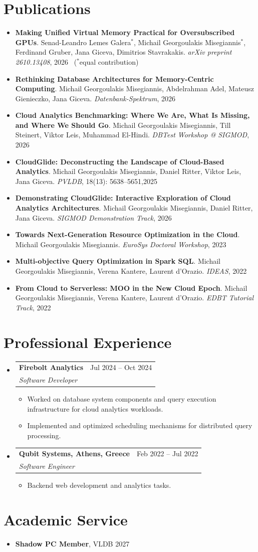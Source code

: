 \documentclass[letterpaper,11pt]{article}
\makeatletter
\newcommand{\resumeItem}[1]{
  \item\small{
    {#1 \vspace{-2pt}}
  }
}
\newcommand{\resumeSubheading}[4]{
  \vspace{-2pt}\item
    \begin{tabular*}{0.97\textwidth}[t]{l@{\extracolsep{\fill}}r}
      \textbf{#1} & #2 \\
      \textit{\small#3} & \textit{\small #4} \\
    \end{tabular*}\vspace{-7pt}
}
\newcommand{\resumeSubHeadingListStart}{\begin{itemize}[leftmargin=0.15in, label={}]}
\newcommand{\resumeSubHeadingListEnd}{\end{itemize}}
\newcommand{\resumeItemListStart}{\begin{itemize}}
\newcommand{\resumeItemListEnd}{\end{itemize}\vspace{-5pt}}
\newcommand{\resumePubItem}[4]{
  \item \normalsize{
    \textbf{#1}. #2. \textit{#3}, #4 \vspace{-2pt}
  }
}
\makeatother
\begin{document}
\section{Publications}
\resumeItemListStart
\resumePubItem
{Making Unified Virtual Memory Practical for Oversubscribed GPUs}
{Senad-Leandro Lemes Galera$^{*}$, Michail Georgoulakis Misegiannis$^{*}$, Ferdinand Gruber, Jana Giceva, Dimitrios Stavrakakis}
{arXiv preprint 2610.13408}
{2026 \ ($^{*}$equal contribution)}
\resumePubItem
{Rethinking Database Architectures for Memory-Centric Computing}
{Michail Georgoulakis Misegiannis, Abdelrahman Adel, Mateusz Gienieczko, Jana Giceva}
{Datenbank-Spektrum}
{2026}
\resumePubItem
{Cloud Analytics Benchmarking: Where We Are, What Is Missing, and Where We Should Go}
{Michail Georgoulakis Misegiannis, Till Steinert, Viktor Leis, Muhammad El-Hindi}
{DBTest Workshop @ SIGMOD}
{2026}
\resumePubItem
{CloudGlide: Deconstructing the Landscape of Cloud-Based Analytics}
{Michail Georgoulakis Misegiannis, Daniel Ritter, Viktor Leis, Jana Giceva}
{PVLDB}
{18(13): 5638--5651,2025}
\resumePubItem
{Demonstrating CloudGlide: Interactive Exploration of Cloud Analytics Architectures}
{Michail Georgoulakis Misegiannis, Daniel Ritter, Jana Giceva}
{SIGMOD Demonstration Track}
{2026}
\resumePubItem
{Towards Next-Generation Resource Optimization in the Cloud}
{Michail Georgoulakis Misegiannis}
{EuroSys Doctoral Workshop}
{2023}
\resumePubItem
{Multi-objective Query Optimization in Spark SQL}
{Michail Georgoulakis Misegiannis, Verena Kantere, Laurent d'Orazio}
{IDEAS}
{2022}
\resumePubItem
{From Cloud to Serverless: MOO in the New Cloud Epoch}
{Michail Georgoulakis Misegiannis, Verena Kantere, Laurent d'Orazio}
{EDBT Tutorial Track}
{2022}
\resumeItemListEnd
\section{Professional Experience}
\resumeSubHeadingListStart
\resumeSubheading
{Firebolt Analytics}{Jul 2024 -- Oct 2024}
{Software Developer}{}
\resumeItemListStart
\resumeItem{Worked on database system components and query execution infrastructure for cloud analytics workloads.}
\resumeItem{Implemented and optimized scheduling mechanisms for distributed query processing.}
\resumeItemListEnd
\resumeSubheading
{Qubit Systems, Athens, Greece}{Feb 2022 -- Jul 2022}
{Software Engineer}{}
\resumeItemListStart
\resumeItem{Backend web development and analytics tasks.}
\resumeItemListEnd
\resumeSubHeadingListEnd
\section{Academic Service}
\resumeItemListStart
\resumeItem{\textbf{Shadow PC Member}, VLDB 2027}
\resumeItemListEnd
\end{document}
